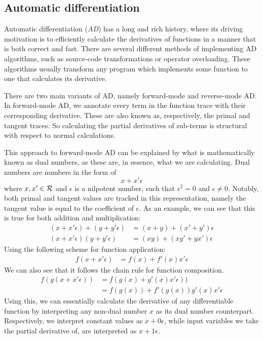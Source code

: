 \subsection{Automatic differentiation}
Automatic differentiation (\textit{AD}) has a long and rich history, where its driving motivation is to efficiently calculate the derivatives of functions in a manner that is both correct and fast\cite{Baydin2015AutomaticDI}.
There are several different methods of implementing AD algorithms, such as source-code transformations or operator overloading.
These algorithms usually transform any program which implements some function to one that calculates its derivative.

There are two main variants of AD, namely forward-mode and reverse-mode AD.
In forward-mode AD, we annotate every term in the function trace with their corresponding derivative.
These are also known as, respectively, the primal and tangent traces.
So calculating the partial derivatives of sub-terms is structural with respect to normal calculations.

This approach to forward-mode AD can be explained by what is mathematically known as dual numbers, as these are, in essence, what we are calculating\cite{Baydin2015AutomaticDI}. Dual numbers are numbers in the form of
$$
  x + x' \epsilon
$$
where $x, x' \in \mathcal{R}$ and $\epsilon$ is a nilpotent number, such that $\epsilon^2 = 0$ and $\epsilon \neq 0$.
Notably, both primal and tangent values are tracked in this representation, namely the tangent value is equal to the coefficient of $\epsilon$.
As an example, we can see that this is true for both addition and multiplication:
\begin{align*}
  (x + x' \epsilon) + (y + y' \epsilon) &= (x + y) + (x' + y')\epsilon \\
  (x + x' \epsilon)(y + y' \epsilon) &= (xy) + (xy' + yx')\epsilon
\end{align*}
Using the following scheme for function application:
\begin{align*}
  f(x + x' \epsilon) &= f(x) + f'(x)x'\epsilon
\end{align*}
We can also see that it follows the chain rule for function composition.
\begin{align*}
  f(g(x + x' \epsilon)) &= f(g(x) + g'(x)x'\epsilon)) \\
    &= f(g(x)) + f'(g(x))g'(x)x'\epsilon
\end{align*}
Using this, we can essentially calculate the derivative of any differentiable function by interpreting any non-dual number $x$ as its dual number counterpart. Respectively, we interpret constant values as $x + 0\epsilon$, while input variables we take the partial derivative of, are interpreted as $x + 1\epsilon$.

